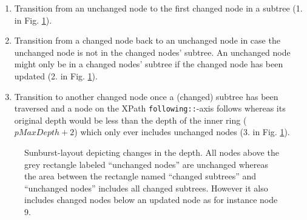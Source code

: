 \begin{enumerate}
\item Transition from an unchanged node to the first changed node in a subtree (1. in Fig. \ref{fig:sunburst-layout}). 
\item Transition from a changed node back to an unchanged node in case the unchanged node is not in the changed nodes' subtree. An unchanged node might only be in a changed nodes' subtree if the changed node has been updated (2. in Fig. \ref{fig:sunburst-layout}).
\item Transition to another changed node once a (changed) subtree has been traversed and a node on the XPath \texttt{following::}-axis follows whereas its original depth would be less than the depth of the inner ring ($pMaxDepth + 2$) which only ever includes unchanged nodes (3. in Fig. \ref{fig:sunburst-layout}).
\end{enumerate}

\begin{figure}[tb]
\caption{\label{fig:sunburst-layout} Sunburst-layout depicting changes in the depth. All nodes above the grey rectangle labeled ``unchanged nodes'' are unchanged whereas the area between the rectangle named ``changed subtrees'' and ``unchanged nodes'' includes all changed subtrees. However it also includes changed nodes below an updated node as for instance node 9.}
\end{figure}

